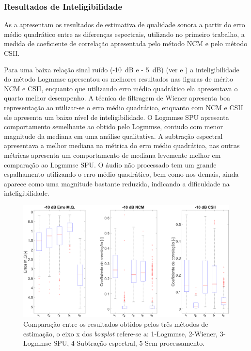 \subsubsection{Resultados de Inteligibilidade}

As  a  apresentam os resultados de estimativa de qualidade sonora a partir do erro médio quadrático entre as diferenças espectrais, utilizado no primeiro trabalho, a medida de coeficiente de correlação apresentada pelo método NCM e pelo método CSII. 

Para uma baixa relação sinal ruído (-10~dB e - 5~dB) (ver  e ) a inteligibilidade do método Logmmse apresentou os melhores resultados nas figuras de mérito NCM e CSII, enquanto que utilizando erro médio quadrático ela apresentava o quarto melhor desempenho. A técnica de filtragem de Wiener apresenta boa representação ao utilizar-se o erro médio quadrático, enquanto com NCM e CSII ele apresenta um baixo nível de inteligibilidade. O Logmmse SPU apresenta comportamento semelhante ao obtido pelo Logmmse, contudo com menor magnitude da mediana em uma análise qualitativa. A subtração espectral apresentava a melhor mediana na métrica do erro médio quadrático, nas outras métricas apresenta um comportamento de mediana levemente melhor em comparação ao Logmmse SPU. O áudio não processado tem um grande espalhamento utilizando o erro médio quadrático, bem como nos demais, ainda aparece como uma magnitude bastante reduzida, indicando a dificuldade na inteligibilidade.

\begin{figure}[H]
\centering
\includegraphics[width=1\linewidth]{Figs/int_m10}
\caption{Comparação entre os resultados obtidos pelos três métodos de estimação, o eixo x dos \textit{boxplot} refere-se a: 1-Logmmse, 2-Wiener, 3-Logmmse SPU, 4-Subtração espectral, 5-Sem processamento.}
\label{i1}
\end{figure}


